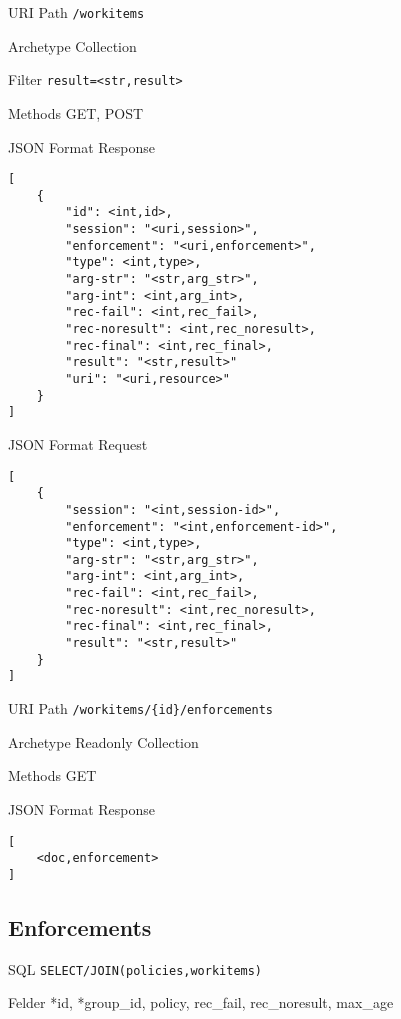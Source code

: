 \documentclass[10pt,a4paper]{scrartcl}
\begin{document}
\begin{mdframed}[style=def]
\begin{description*}
	\item[URI Path] \texttt{/workitems}
	\item[Archetype] Collection
	\item[Filter] \texttt{result=<str,result>}
	\item[Methods] GET, POST
	\item[JSON Format Response] \hfill
\begin{lstlisting}
[
	{
		"id": <int,id>,
		"session": "<uri,session>",
		"enforcement": "<uri,enforcement>",
		"type": <int,type>,
		"arg-str": "<str,arg_str>",
		"arg-int": <int,arg_int>,
		"rec-fail": <int,rec_fail>,
		"rec-noresult": <int,rec_noresult>, 
		"rec-final": <int,rec_final>,
		"result": "<str,result>"
		"uri": "<uri,resource>"
	}
]
\end{lstlisting}
	\item[JSON Format Request] \hfill
\begin{lstlisting}
[
	{
		"session": "<int,session-id>",
		"enforcement": "<int,enforcement-id>",
		"type": <int,type>,
		"arg-str": "<str,arg_str>",
		"arg-int": <int,arg_int>,
		"rec-fail": <int,rec_fail>,
		"rec-noresult": <int,rec_noresult>, 
		"rec-final": <int,rec_final>,
		"result": "<str,result>"
	}
]
\end{lstlisting}
\end{description*}
\end{mdframed}

\begin{mdframed}[style=def]
\begin{description*}
	\item[URI Path] \texttt{/workitems/\{id\}/enforcements}
	\item[Archetype] Readonly Collection
	\item[Methods] GET
	\item[JSON Format Response] \hfill
\begin{lstlisting}
[
	<doc,enforcement>
]
\end{lstlisting}
\end{description*}
\end{mdframed}


\pagebreak
\subsection{Enforcements}

\begin{description*}
	\item[SQL] \texttt{SELECT/JOIN(policies,workitems)}
	\item[Felder] *id, *group\_id, policy, rec\_fail, rec\_noresult, max\_age
\end{description*}
\end{document}
